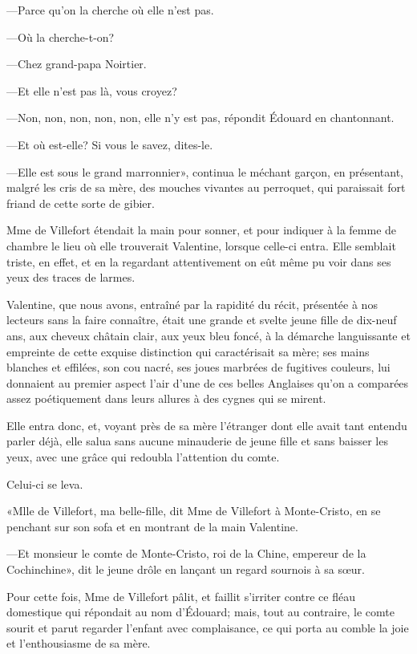 —Parce qu'on la cherche où elle n'est pas. 

—Où la cherche-t-on?  

—Chez grand-papa Noirtier. 

—Et elle n'est pas là, vous croyez? 

—Non, non, non, non, non, elle n'y est pas, répondit Édouard en chantonnant. 

—Et où est-elle? Si vous le savez, dites-le. 

—Elle est sous le grand marronnier», continua le méchant garçon, en présentant, malgré les cris de sa mère, des mouches vivantes au perroquet, qui paraissait fort friand de cette sorte de gibier. 

Mme de Villefort étendait la main pour sonner, et pour indiquer à la femme de chambre le lieu où elle trouverait Valentine, lorsque celle-ci entra. Elle semblait triste, en effet, et en la regardant attentivement on eût même pu voir dans ses yeux des traces de larmes. 

Valentine, que nous avons, entraîné par la rapidité du récit, présentée à nos lecteurs sans la faire connaître, était une grande et svelte jeune fille de dix-neuf ans, aux cheveux châtain clair, aux yeux bleu foncé, à la démarche languissante et empreinte de cette exquise distinction qui caractérisait sa mère; ses mains blanches et effilées, son cou nacré, ses joues marbrées de fugitives couleurs, lui donnaient au premier aspect l'air d'une de ces belles Anglaises qu'on a comparées assez poétiquement dans leurs allures à des cygnes qui se mirent.  

Elle entra donc, et, voyant près de sa mère l'étranger dont elle avait tant entendu parler déjà, elle salua sans aucune minauderie de jeune fille et sans baisser les yeux, avec une grâce qui redoubla l'attention du comte. 

Celui-ci se leva. 

«Mlle de Villefort, ma belle-fille, dit Mme de Villefort à Monte-Cristo, en se penchant sur son sofa et en montrant de la main Valentine. 

—Et monsieur le comte de Monte-Cristo, roi de la Chine, empereur de la Cochinchine», dit le jeune drôle en lançant un regard sournois à sa sœur.  

Pour cette fois, Mme de Villefort pâlit, et faillit s'irriter contre ce fléau domestique qui répondait au nom d'Édouard; mais, tout au contraire, le comte sourit et parut regarder l'enfant avec complaisance, ce qui porta au comble la joie et l'enthousiasme de sa mère. 

